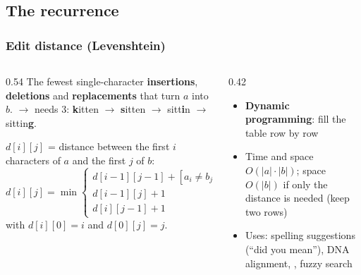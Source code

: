 \documentclass[aspectratio=169,10pt,compress]{beamer}
\begin{document}
\subsection[Recurrence]{The recurrence}




\begin{frame}[t,fragile] \frametitle{Edit distance (Levenshtein)}
  \begin{columns}[T]
    \begin{column}{0.54\textwidth}
      \small The fewest single-character \textbf{insertions}, \textbf{deletions} and \textbf{replacements}
      that turn $a$ into $b$.  $\to$  needs 3:
      \textbf{k}itten $\to$ \textbf{s}itten $\to$ sitt\textbf{i}n $\to$ sittin\textbf{g}.

      \vspace{0.3em}
      $d[i][j]$ = distance between the first $i$ characters of $a$ and the first $j$ of $b$:
      \[
      	d[i][j] = \min
      	\begin{cases}
      		d[i-1][j-1] + [a_{i} \neq b_{j}] & \text{replace or keep} \\
      		d[i-1][j] + 1 & \text{delete } a_{i} \\
      		d[i][j-1] + 1 & \text{insert } b_{j}
      	\end{cases}
      \]
      with $d[i][0] = i$ and $d[0][j] = j$.
    \end{column}
    \begin{column}{0.42\textwidth}
      
      \begin{itemize}\small
        
        \item \textbf{Dynamic programming}: fill the table row by row
        
        \item Time and space $O(|a| \cdot |b|)$; space $O(|b|)$ if only the distance is needed (keep two rows)
        
        \item Uses: spelling suggestions (``did you mean''), DNA alignment, , fuzzy search
      \end{itemize}
    
    \end{column}
  \end{columns}
\end{frame}
\end{document}
